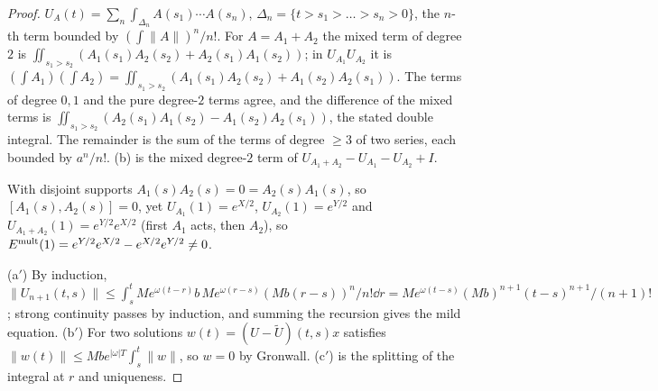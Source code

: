 \begin{proof}
$U_A(t)=\sum_n\int_{\Delta_n}A(s_1)\cdots A(s_n)$, $\Delta_n=\{t>s_1>\dots>s_n>0\}$, the $n$-th term bounded by $(\int\|A\|)^n/n!$. For $A=A_1+A_2$ the mixed term of degree $2$ is $\iint_{s_1>s_2}(A_1(s_1)A_2(s_2)+A_2(s_1)A_1(s_2))$; in $U_{A_1}U_{A_2}$ it is $(\int A_1)(\int A_2)=\iint_{s_1>s_2}(A_1(s_1)A_2(s_2)+A_1(s_2)A_2(s_1))$. The terms of degree $0,1$ and the pure degree-$2$ terms agree, and the difference of the mixed terms is $\iint_{s_1>s_2}(A_2(s_1)A_1(s_2)-A_1(s_2)A_2(s_1))$, the stated double integral. The remainder is the sum of the terms of degree $\ge3$ of two series, each bounded by $a^n/n!$. (b) is the mixed degree-$2$ term of $U_{A_1+A_2}-U_{A_1}-U_{A_2}+I$.

With disjoint supports $A_1(s)A_2(s)=0=A_2(s)A_1(s)$, so $[A_1(s),A_2(s)]=0$, yet $U_{A_1}(1)=e^{X/2}$, $U_{A_2}(1)=e^{Y/2}$ and $U_{A_1+A_2}(1)=e^{Y/2}e^{X/2}$ (first $A_1$ acts, then $A_2$), so $E^{\rm mult}(1)=e^{Y/2}e^{X/2}-e^{X/2}e^{Y/2}\ne0$.

(a$'$) By induction, $\|U_{n+1}(t,s)\|\le\int_s^tMe^{\omega(t-r)}b\,Me^{\omega(r-s)}(Mb(r-s))^n/n!\dd r=Me^{\omega(t-s)}(Mb)^{n+1}(t-s)^{n+1}/(n+1)!$; strong continuity passes by induction, and summing the recursion gives the mild equation. (b$'$) For two solutions $w(t)=(U-\tilde U)(t,s)x$ satisfies $\|w(t)\|\le Mbe^{|\omega|T}\int_s^t\|w\|$, so $w=0$ by Gronwall. (c$'$) is the splitting of the integral at $r$ and uniqueness.

\end{proof}

